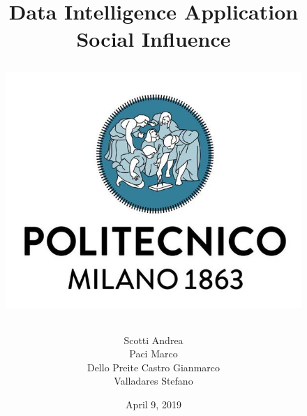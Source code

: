 \documentclass[12pt, a4paper]{article}
\begin{document}

\title{Data Intelligence Application\\ \vspace{1em}  {\textbf{Social Influence}} \\ 
	\vspace{1.5em}
\begin{figure}[H]
	\centering
	\includegraphics[scale=0.4]{Logo-PoliMi}
\end{figure}
}
\author{ Scotti Andrea \\ Paci Marco\\ Dello Preite Castro Gianmarco \\ Valladares Stefano}

\date{April 9, 2019}

\maketitle

\newpage
\tableofcontents

\newpage












\newpage
\appendix
\end{document}
